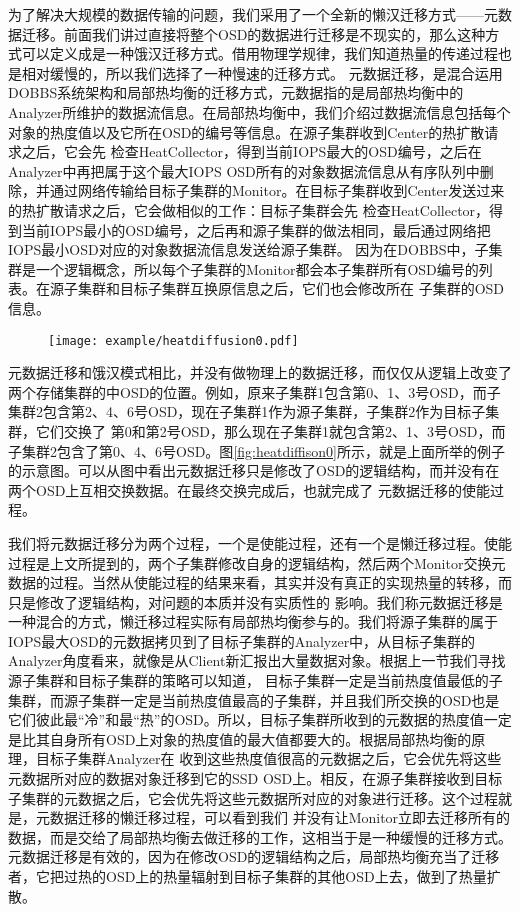 为了解决大规模的数据传输的问题，我们采用了一个全新的懒汉迁移方式——元数据迁移。前面我们讲过直接将整个OSD的数据进行迁移是不现实的，那么这种方式可以定义成是一种饿汉迁移方式。借用物理学规律，我们知道热量的传递过程也是相对缓慢的，所以我们选择了一种慢速的迁移方式。
元数据迁移，是混合运用DOBBS系统架构和局部热均衡的迁移方式，元数据指的是局部热均衡中的Analyzer所维护的数据流信息。在局部热均衡中，我们介绍过数据流信息包括每个对象的热度值以及它所在OSD的编号等信息。在源子集群收到Center的热扩散请求之后，它会先
检查HeatCollector，得到当前IOPS最大的OSD编号，之后在Analyzer中再把属于这个最大IOPS OSD所有的对象数据流信息从有序队列中删除，并通过网络传输给目标子集群的Monitor。在目标子集群收到Center发送过来的热扩散请求之后，它会做相似的工作：目标子集群会先
检查HeatCollector，得到当前IOPS最小的OSD编号，之后再和源子集群的做法相同，最后通过网络把IOPS最小OSD对应的对象数据流信息发送给源子集群。
因为在DOBBS中，子集群是一个逻辑概念，所以每个子集群的Monitor都会本子集群所有OSD编号的列表。在源子集群和目标子集群互换原信息之后，它们也会修改所在
子集群的OSD信息。

\begin{figure}[!htp]
    \centering
    \texttt{[image: example/heatdiffusion0.pdf]}
\end{figure}

元数据迁移和饿汉模式相比，并没有做物理上的数据迁移，而仅仅从逻辑上改变了两个存储集群的中OSD的位置。例如，原来子集群1包含第0、1、3号OSD，而子集群2包含第2、4、6号OSD，现在子集群1作为源子集群，子集群2作为目标子集群，它们交换了
第0和第2号OSD，那么现在子集群1就包含第2、1、3号OSD，而子集群2包含了第0、4、6号OSD。图\ref{fig:heatdiffison0}所示，就是上面所举的例子的示意图。可以从图中看出元数据迁移只是修改了OSD的逻辑结构，而并没有在两个OSD上互相交换数据。在最终交换完成后，也就完成了
元数据迁移的使能过程。

我们将元数据迁移分为两个过程，一个是使能过程，还有一个是懒迁移过程。使能过程是上文所提到的，两个子集群修改自身的逻辑结构，然后两个Monitor交换元数据的过程。当然从使能过程的结果来看，其实并没有真正的实现热量的转移，而只是修改了逻辑结构，对问题的本质并没有实质性的
影响。我们称元数据迁移是一种混合的方式，懒迁移过程实际有局部热均衡参与的。我们将源子集群的属于IOPS最大OSD的元数据拷贝到了目标子集群的Analyzer中，从目标子集群的Analyzer角度看来，就像是从Client新汇报出大量数据对象。根据上一节我们寻找源子集群和目标子集群的策略可以知道，
目标子集群一定是当前热度值最低的子集群，而源子集群一定是当前热度值最高的子集群，并且我们所交换的OSD也是它们彼此最“冷”和最“热”的OSD。所以，目标子集群所收到的元数据的热度值一定是比其自身所有OSD上对象的热度值的最大值都要大的。根据局部热均衡的原理，目标子集群Analyzer在
收到这些热度值很高的元数据之后，它会优先将这些元数据所对应的数据对象迁移到它的SSD OSD上。相反，在源子集群接收到目标子集群的元数据之后，它会优先将这些元数据所对应的对象进行迁移。这个过程就是，元数据迁移的懒迁移过程，可以看到我们
并没有让Monitor立即去迁移所有的数据，而是交给了局部热均衡去做迁移的工作，这相当于是一种缓慢的迁移方式。元数据迁移是有效的，因为在修改OSD的逻辑结构之后，局部热均衡充当了迁移者，它把过热的OSD上的热量辐射到目标子集群的其他OSD上去，做到了热量扩散。

